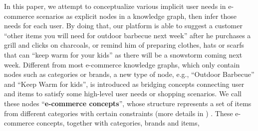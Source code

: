 In this paper, we attempt to conceptualize various implicit user needs in e-commerce 
scenarios as explicit nodes in a knowledge graph, 
then infer those needs for each user.
By doing that, our platform is able to suggest a customer 
``other items you will need for outdoor barbecue next week'' 
after he purchases a grill and clicks on charcoals,
or remind him of preparing clothes, hats or scarfs that can ``keep warm for your kids'' as 
there will be a snowstorm coming next week.
Different from most e-commerce knowledge graphs, which only contain
nodes such as categories or brands,
a new type of node, e.g.,
``Outdoor Barbecue'' and ``Keep Warm for kids'', is introduced as 
bridging concepts connecting user and items to satisfy some 
high-level user needs or shopping scenarios. 
We call these nodes ``\textbf{e-commerce concepts}'',
whose structure represents a set of items from different categories 
with certain constraints (more details in ) .
These e-commerce concepts, together with categories, brands and items, 
